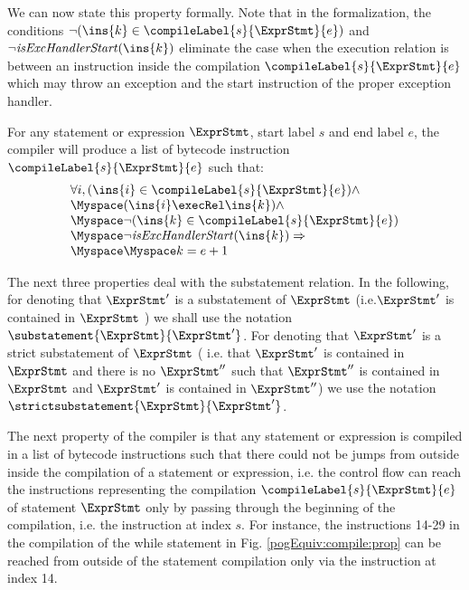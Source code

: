 We can now state this property formally.
 Note that in the formalization,  the conditions  $ \neg (\ins{k} \in  \compileLabel{s}{\ExprStmt}{e} )  $ and 
$\neg \isStartExc{\ins{k}}$  eliminate the case when the execution relation is between an instruction inside 
the compilation $\compileLabel{s}{\ExprStmt}{e}$ which may throw an exception and the start instruction of the proper exception handler.
\begin{compProp1}\label{compile:prop:compProp1}
    For any statement or expression $\ExprStmt$, start label $s$ and end label $e$,
    the compiler will produce a list of bytecode instruction $\compileLabel{s}{\ExprStmt}{e}$ such that: 
           $$ \begin{array}{l} 
                             \forall i, ( \ins{i} \in \compileLabel{s}{\ExprStmt }{e} ) \wedge \\
			     \Myspace ( \ins{i} \execRel \ins{k}) \wedge \\
			     \Myspace \neg (\ins{k} \in   \compileLabel{s}{\ExprStmt}{e}  ) \\
			     \Myspace \neg \isStartExc{\ins{k}}     \Rightarrow   \\
                             \Myspace \Myspace k = e + 1  \\
			     
              \end{array}$$ 
\end{compProp1}


 
The next three properties deal with the substatement relation. 
In the following, for denoting that  $\ExprStmt'$ is a substatement of  $\ExprStmt$ (i.e.$\ExprStmt'$ is contained in  $\ExprStmt$  )
we shall use the notation $\substatement{\ExprStmt }{\ExprStmt'}$.
For denoting that  $\ExprStmt'$ is a strict substatement of  $\ExprStmt$ ( i.e. that $\ExprStmt'$  is contained in $\ExprStmt$ 
and there is no   $\ExprStmt''$  such that  $\ExprStmt''$ is contained in   $\ExprStmt$ and  $\ExprStmt'$ is contained in  $\ExprStmt''$)
we use the notation $\strictsubstatement{\ExprStmt }{\ExprStmt'}$.

The next  property  of the compiler is that any statement or expression   is
 compiled in a list of bytecode instructions 
such that there could not be jumps  from outside inside the compilation of a statement or expression, i.e.
the control flow can reach the instructions representing the compilation $\compileLabel{s}{\ExprStmt}{e}$ 
 of statement $\ExprStmt$  only by passing   through the beginning of the compilation, i.e. the instruction at index $s$. 
 For instance, the instructions 14-29 in the compilation of the while statement
 in Fig. \ref{pogEquiv:compile:prop} 
 can be reached from outside of the statement compilation only via the instruction at index 14.

